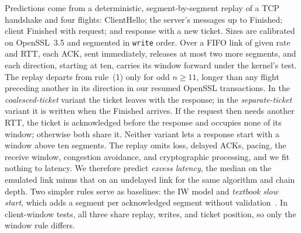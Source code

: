 \documentclass[sigconf,9pt,nonacm]{acmart}
\begin{document}
Predictions come from a deterministic, segment-by-segment replay of a TCP handshake and four flights: ClientHello; the server's messages up to Finished; client Finished with request; and response with a new ticket. Sizes are calibrated on OpenSSL~3.5 and segmented in \texttt{write} order. Over a FIFO link of given rate and RTT, each ACK, sent immediately, releases at most two more segments, and each direction, starting at ten, carries its window forward under the kernel's test. The replay departs from rule~(1) only for odd $n\ge11$, longer than any flight preceding another in its direction in our resumed OpenSSL transactions. In the \emph{coalesced-ticket} variant the ticket leaves with the response; in the \emph{separate-ticket} variant it is written when the Finished arrives. If the request then needs another RTT, the ticket is acknowledged before the response and occupies none of its window; otherwise both share it. Neither variant lets a response start with a window above ten segments. The replay omits loss, delayed ACKs, pacing, the receive window, congestion avoidance, and cryptographic processing, and we fit nothing to latency. We therefore predict \emph{excess latency}, the median on the emulated link minus that on an undelayed link for the same algorithm and chain depth. Two simpler rules serve as baselines: the IW model and \emph{textbook slow start}, which adds a segment per acknowledged segment without validation~\cite{rfc5681}. In client-window tests, all three share replay, writes, and ticket position, so only the window rule differs.
\end{document}
